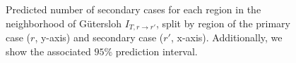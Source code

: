 \begin{figure}
   \resizebox{\textwidth}{!}{%
        
}
    \caption{Predicted number of secondary cases for each region in the neighborhood of Gütersloh $I_{T, r\to r'}$, split by region of the primary case ($r$, y-axis) and secondary case ($r'$, x-axis). Additionally, we show the associated $95\%$ prediction interval.}
    \label{fig:guetersloh_neighbors_cases}
\end{figure}
